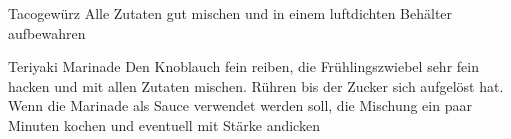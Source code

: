 \begin{recipe}{Tacogewürz}{}{}
Alle Zutaten gut mischen und in einem luftdichten Behälter aufbewahren
\end{recipe}


\begin{recipe}{Teriyaki Marinade}{}{}
Den Knoblauch fein reiben, die Frühlingszwiebel sehr fein hacken und mit allen Zutaten mischen. Rühren bis der Zucker sich aufgelöst hat. Wenn die Marinade als Sauce verwendet werden soll, die Mischung ein paar Minuten kochen und eventuell mit Stärke andicken
\end{recipe} 

